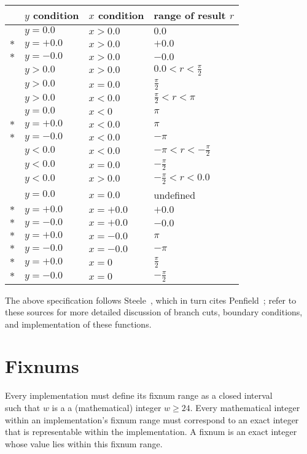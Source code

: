 \begin{center}
\begin{tabular}{clll}
& $y$ condition & $x$ condition & range of result $r$\\\hline
& $y = 0.0$ & $x > 0.0$ & $0.0$\\
$\ast$ & $y = +0.0$  & $x > 0.0$ & $+0.0$\\     
$\ast$ & $y = -0.0$ & $x > 0.0$ & $-0.0$\\
& $y > 0.0$ & $x > 0.0$ & $0.0 < r < \frac{\pi}{2}$\\
& $y > 0.0$ & $x = 0.0$ & $\frac{\pi}{2}$\\
& $y > 0.0$ & $x < 0.0$ & $\frac{\pi}{2} < r < \pi$\\
& $y = 0.0$ & $x < 0$ & $\pi$\\
$\ast$ & $y = +0.0$ & $x < 0.0$ & $\pi$\\
$\ast$ & $y = -0.0$ & $x < 0.0$ & $-\pi$\\      
&$y < 0.0$ & $x < 0.0$ & $-\pi< r< -\frac{\pi}{2}$\\
&$y < 0.0$ & $x = 0.0$ & $-\frac{\pi}{2}$\\
&$y < 0.0$ & $x > 0.0$ & $-\frac{\pi}{2} < r< 0.0$\\    
&$y = 0.0$ & $x = 0.0$ & undefined\\
$\ast$& $y = +0.0$ & $x = +0.0$ & $+0.0$\\
$\ast$& $y = -0.0$ & $x = +0.0$& $-0.0$\\
$\ast$& $y = +0.0$ & $x = -0.0$ & $\pi$\\
$\ast$& $y = -0.0$ & $x = -0.0$ & $-\pi$\\
$\ast$& $y = +0.0$ & $x = 0$ & $\frac{\pi}{2}$\\
$\ast$& $y = -0.0$ & $x = 0$    & $-\frac{\pi}{2}$
\end{tabular}
\end{center}

The above specification follows Steele~\cite{CLtL}, which in turn
cites Penfield~\cite{Penfield81}; refer to these sources for more detailed
discussion of branch cuts, boundary conditions, and implementation of
these functions.

\section{Fixnums}
\label{fixnumssection}

Every implementation must define its fixnum range as a closed
interval
%
\begin{displaymath}
[-2^{w-1}, 2^{w-1} - 1]
\end{displaymath}
%
such that $w$ is a a (mathematical) integer $w \geq 24$.  Every
mathematical integer within an implementation's fixnum range must
correspond to an exact integer that is representable within the
implementation.
A fixnum is an exact integer whose value lies within this
fixnum range.

